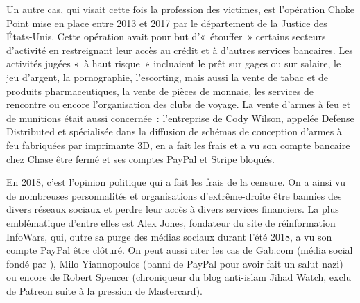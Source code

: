 Un autre cas, qui visait cette fois la profession des victimes, est l'opération Choke Point mise en place entre 2013 et 2017 par le département de la Justice des États-Unis. Cette opération avait pour but d'«~étouffer~» certains secteurs d'activité en restreignant leur accès au crédit et à d'autres services bancaires. Les activités jugées «~à haut risque~» incluaient le prêt sur gages ou sur salaire, le jeu d'argent, la pornographie, l'escorting, mais aussi la vente de tabac et de produits pharmaceutiques, la vente de pièces de monnaie, les services de rencontre ou encore l'organisation des clubs de voyage. La vente d'armes à feu et de munitions était aussi concernée~: l'entreprise de Cody Wilson, appelée Defense Distributed et spécialisée dans la diffusion de schémas de conception d'armes à feu fabriquées par imprimante 3D, en a fait les frais et a vu son compte bancaire chez Chase être fermé et ses comptes PayPal et Stripe bloqués.


En 2018, c'est l'opinion politique qui a fait les frais de la censure. On a ainsi vu de nombreuses personnalités et organisations d'extrême-droite être bannies des divers réseaux sociaux et perdre leur accès à divers services financiers. La plus emblématique d'entre elles est Alex Jones, fondateur du site de réinformation InfoWars, qui, outre sa purge des médias sociaux durant l'été 2018, a vu son compte PayPal être clôturé. On peut aussi citer les cas de Gab.com (média social fondé par ), Milo Yiannopoulos (banni de PayPal pour avoir fait un salut nazi) ou encore de Robert Spencer (chroniqueur du blog anti-islam Jihad Watch, exclu de Patreon suite à la pression de Mastercard).

